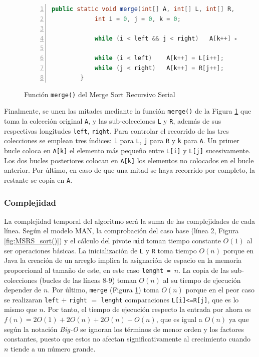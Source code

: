 \documentclass[titlepage]{article}
\begin{document}
\begin{figure}[hbtp]
    \begin{lstlisting}[language=java, frame=single, numbers=left]
        public static void merge(int[] A, int[] L, int[] R, int left, int right) {
            int i = 0, j = 0, k = 0;
    
            while (i < left && j < right)   A[k++] = (L[i] <= R[j])? L[i++] : R[j++];
    
            while (i < left)    A[k++] = L[i++];
            while (j < right)   A[k++] = R[j++];
        }
    \end{lstlisting}
    \caption{Función \lstinline{merge()} del Merge Sort Recursivo Serial}
    \label{fig:MSRS_merge()}
\end{figure}

Finalmente, se unen las mitades mediante la función \lstinline{merge()} de la Figura \ref{fig:MSRS_merge()} que toma la colección original \lstinline{A}, y las sub-colecciones \lstinline{L} y \lstinline{R}, además de sus respectivas longitudes \lstinline{left}, \lstinline{right}. Para controlar el recorrido de las tres colecciones se emplean tres índices: \lstinline{i} para \lstinline{L}, \lstinline{j} para \lstinline{R} y \lstinline{k} para \lstinline{A}. Un primer bucle coloca en \lstinline{A[k]} el elemento más pequeño entre \lstinline{L[i]} y \lstinline{L[j]} sucesivamente. Los dos bucles posteriores colocan en \lstinline{A[k]} los elementos no colocados en el bucle anterior. Por último, en caso de que una mitad se haya recorrido por completo, la restante se copia en \lstinline{A}.

\subsubsection{Complejidad}
La complejidad temporal del algoritmo será la suma de las complejidades de cada línea. Según el modelo MAN, la comprobación del caso base (línea 2, Figura \ref{fig:MSRS_sort()}) y el cálculo del pivote \lstinline{mid} toman tiempo constante \(O(1)\) al ser operaciones básicas. La inicialización de \lstinline{L} y \lstinline{R} toma tiempo \(O(n)\) porque en Java la creación de un arreglo implica la asignación de espacio en la memoria proporcional al tamaño de este, en este caso \lstinline{lenght = }\(n\). La copia de las sub-colecciones (bucles de las líneas 8-9) toman \(O(n)\) al su tiempo de ejecución depender de \(n\). Por último, \lstinline{merge} (Figura \ref{fig:MSRS_merge()}) toma \(O(n)\) porque en el peor caso se realizaran \lstinline{left} \(+\) \lstinline{right} \(=\) \lstinline{lenght} comparaciones \lstinline{L[i]<=R[j]}, que es lo mismo que \(n\). Por tanto, el tiempo de ejecución respecto la entrada por ahora es \(f(n) = 2O(1) + 2O(n) + 2O(n)+ O(n)\), que es igual a \(O(n)\) ya que según la notación \textit{Big-O} se ignoran los términos de menor orden y los factores constantes, puesto que estos no afectan significativamente al crecimiento cuando \(n\) tiende a un número grande.
\end{document}
